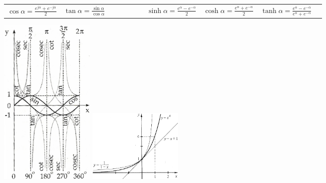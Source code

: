\begin{minipage}{10.5cm}
\begin{tabular}{lllllll}
      $\cos{\alpha} = \frac{e^{j\alpha} + e^{-j\alpha}}{2}$ &
      
      $\tan{\alpha} = \frac{\sin \alpha}{\cos \alpha}$ &
      
      $ \qquad \qquad $ &
      
      $\sinh{\alpha} = \frac{e^\alpha - e^{-\alpha}}{2} $ &
      
      $\cosh{\alpha} = \frac{e^\alpha + e^{-\alpha}}{2} $ &
      
      $\tanh{\alpha} = \frac{e^\alpha - e^{-\alpha}}{e^\alpha + e^{-\alpha}}$
    \end{tabular}    
\end{minipage}
\includegraphics[width=0.2\textwidth]{bilder/funktionen_trigo}
\includegraphics[width=0.2\textwidth]{bilder/funktionen_e}

